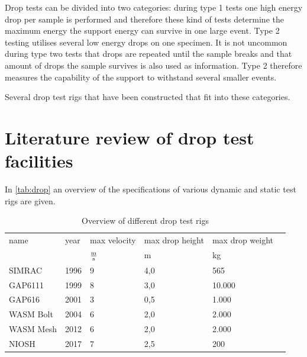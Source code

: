 Drop tests can be divided into two categories: during type 1 tests one high energy drop per sample is performed and therefore these kind of tests determine the maximum energy the support energy can survive in one large event. Type 2 testing utilises several low energy drops on one specimen. It is not uncommon during type two tests that drops are repeated until the sample breaks and that amount of drops the sample survives is also used as information. Type 2 therefore measures the capability of the support to withstand several smaller events. 

Several drop test rigs that have been constructed that fit into these categories.

\chapter{Literature review of drop test facilities}

In \autoref{tab:drop} an overview of the specifications of various dynamic and static test rigs are given. 

\begin{table}[h!]
    \centering
    \begin{tabular}{*{6}{l}}
    \toprule
    name & year& max velocity & max drop height & max drop weight \\
    && \(\frac{\text{m}}{\text{s}}\) &  m & kg \\
\midrule
    SIMRAC      & 1996 & 9      & 4,0   & 565       \\
    GAP6111     & 1999 & 8      & 3,0   & 10.000    \\
    GAP616      & 2001  & 3     & 0,5   & 1.000     \\
    WASM Bolt   & 2004 & 6      & 2,0   & 2.000     \\
    WASM Mesh   & 2012 & 6      & 2,0   & 2.000     \\
    NIOSH       & 2017 & 7      & 2,5   & 200       \\
    \end{tabular}
    \caption{Overview of different drop test rigs}
    \label{tab:drop}
\end{table}

